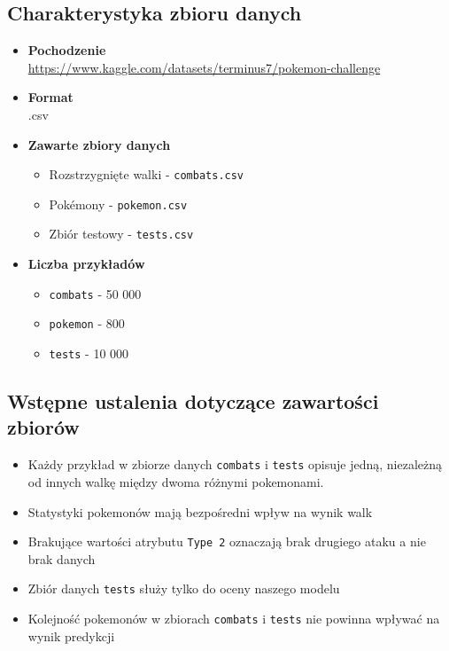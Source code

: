 \documentclass[12pt, a4paper]{report}
\begin{document}
\subsection{Charakterystyka zbioru danych}
\begin{itemize}
    \item \textbf{Pochodzenie}\\ 
    \url{https://www.kaggle.com/datasets/terminus7/pokemon-challenge}
    
    \item \textbf{Format}\\.csv
    
    \item \textbf{Zawarte zbiory danych}
    \begin{itemize}
        \item Rozstrzygnięte walki - \texttt{combats.csv}
        \item Pokémony - \texttt{pokemon.csv}
        \item Zbiór testowy - \texttt{tests.csv}
    \end{itemize}

    \item \textbf{Liczba przykładów}
    \begin{itemize}
        \item \texttt{combats} - 50 000 
        \item \texttt{pokemon} - 800
        \item \texttt{tests} - 10 000 
    \end{itemize}
    
\end{itemize}

\subsection{Wstępne ustalenia dotyczące zawartości zbiorów}

\begin{itemize}
    \item Każdy przykład w zbiorze danych \texttt{combats} i \texttt{tests} opisuje jedną, niezależną od innych walkę między dwoma różnymi pokemonami. 
    \item Statystyki pokemonów mają bezpośredni wpływ na wynik walk
    \item Brakujące wartości atrybutu \texttt{Type 2} oznaczają brak drugiego ataku a nie brak danych
    \item Zbiór danych \texttt{tests} służy tylko do oceny naszego modelu
    \item Kolejność pokemonów w zbiorach \texttt{combats} i \texttt{tests} nie powinna wpływać na wynik predykcji
\end{itemize}
\end{document}
